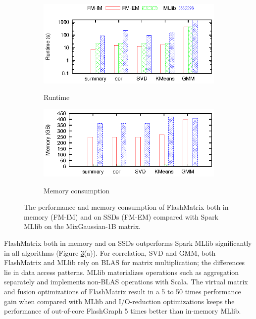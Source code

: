 \begin{figure}
  \vspace{-5pt}
	\centering
	\footnotesize
	\begin{subfigure}{.5\textwidth}
		\includegraphics{FlashMatrix_figs/FM-vs-spark.eps}
		\label{perf:rt}
		\vspace{-12pt}
		\caption{Runtime}
	\end{subfigure}

	\vspace{3pt}
	\begin{subfigure}{.5\textwidth}
		\includegraphics{FlashMatrix_figs/FM-vs-spark-mem.eps}
		\label{perf:mem}
		\vspace{-12pt}
		\caption{Memory consumption}
	\end{subfigure}
	\caption{The performance and memory consumption of FlashMatrix both
		in memory (FM-IM) and on SSDs (FM-EM) compared with Spark MLlib
		on the MixGaussian-1B matrix.}
	\label{perf:fm}
  \vspace{-10pt}
\end{figure}

FlashMatrix both in memory and on SSDs outperforms Spark MLlib significantly
in all algorithms (Figure \ref{perf:fm}(a)). For 
correlation, SVD and GMM, both FlashMatrix and MLlib
rely on BLAS for matrix multiplication; the differences lie in data access patterns.
MLlib materializes operations such as aggregation separately and implements
non-BLAS operations with Scala.  The virtual matrix and fusion optimizations of FlashMatrix result in a 5 to 50 
times performance gain when compared with MLlib and I/O-reduction optimizations keeps the performance of out-of-core
FlashGraph 5 times better than in-memory MLlib.

